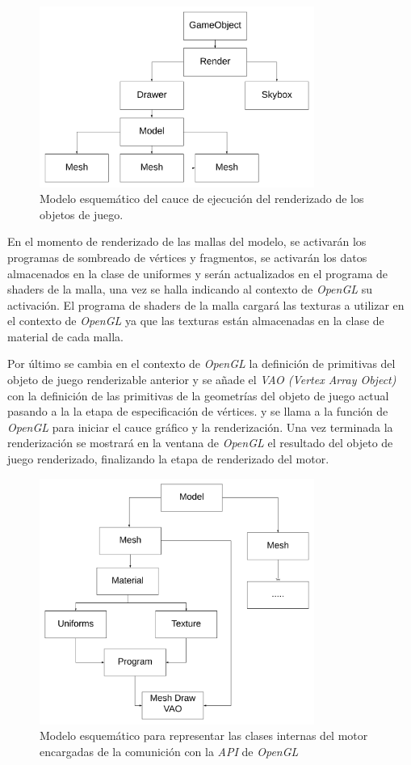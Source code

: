 \documentclass[a4paper]{book}
\begin{document}
\begin{figure}[H]
    \centering
    \includegraphics[width=9cm, keepaspectratio]{img/RenderDiagram.png}
    \caption{Modelo esquemático del cauce de ejecución del renderizado de los objetos de juego.}
    \label{RenderDiagram}
\end{figure}

En el momento de renderizado de las mallas del modelo, se activarán los programas de sombreado de vértices y fragmentos, 
se activarán los datos almacenados en la clase de uniformes y serán actualizados en el programa de shaders de la malla,
una vez se halla indicando al contexto de \textit{OpenGL} su activación. El programa de shaders de la malla cargará las texturas a utilizar
en el contexto de \textit{OpenGL} ya que las texturas están almacenadas en la clase de material de cada malla.

Por último se cambia en el contexto de \textit{OpenGL} la definición de primitivas del objeto
de juego renderizable anterior y se añade el \textit{VAO (Vertex Array Object)} con la definición de las primitivas de la geometrías del objeto de juego 
actual pasando a la la etapa de especificación de vértices. y se llama a la función de \textit{OpenGL} para iniciar el cauce gráfico y la
renderización. Una vez terminada la renderización se mostrará en la ventana de \textit{OpenGL} el resultado del objeto de juego renderizado, 
finalizando la etapa de renderizado del motor.

\begin{figure}[H]
    \centering
    \includegraphics[width=9cm, keepaspectratio]{img/ModelRender.png}
    \caption{Modelo esquemático para representar las clases internas del motor encargadas de la comunición con la \textit{API} de \textit{OpenGL}}
    \label{ModelRender}
\end{figure}
\end{document}
